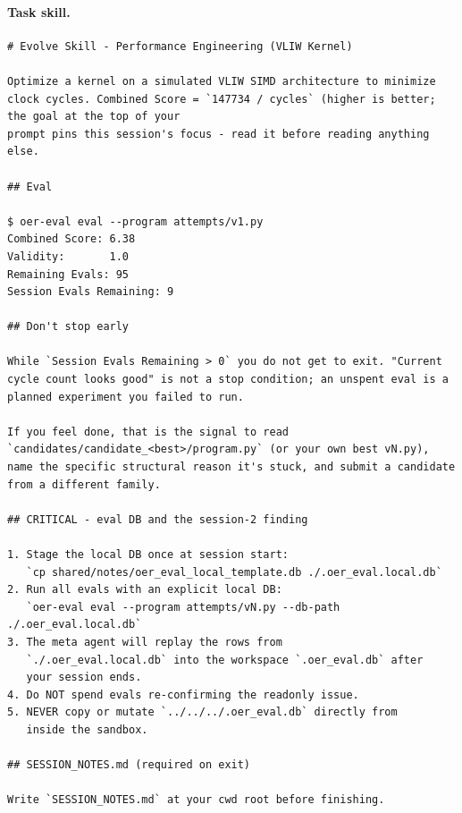 \paragraph{Task skill.}
\begin{lstlisting}[style=papercode]
# Evolve Skill - Performance Engineering (VLIW Kernel)

Optimize a kernel on a simulated VLIW SIMD architecture to minimize
clock cycles. Combined Score = `147734 / cycles` (higher is better;
the goal at the top of your
prompt pins this session's focus - read it before reading anything
else.

## Eval

$ oer-eval eval --program attempts/v1.py
Combined Score: 6.38
Validity:       1.0
Remaining Evals: 95
Session Evals Remaining: 9

## Don't stop early

While `Session Evals Remaining > 0` you do not get to exit. "Current
cycle count looks good" is not a stop condition; an unspent eval is a
planned experiment you failed to run.

If you feel done, that is the signal to read
`candidates/candidate_<best>/program.py` (or your own best vN.py),
name the specific structural reason it's stuck, and submit a candidate
from a different family.

## CRITICAL - eval DB and the session-2 finding

1. Stage the local DB once at session start:
   `cp shared/notes/oer_eval_local_template.db ./.oer_eval.local.db`
2. Run all evals with an explicit local DB:
   `oer-eval eval --program attempts/vN.py --db-path ./.oer_eval.local.db`
3. The meta agent will replay the rows from
   `./.oer_eval.local.db` into the workspace `.oer_eval.db` after
   your session ends.
4. Do NOT spend evals re-confirming the readonly issue.
5. NEVER copy or mutate `../../../.oer_eval.db` directly from
   inside the sandbox.

## SESSION_NOTES.md (required on exit)

Write `SESSION_NOTES.md` at your cwd root before finishing.
\end{lstlisting}

